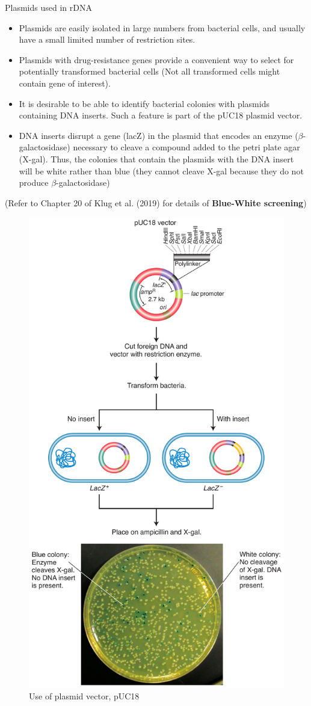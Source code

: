 \documentclass[11pt,dvipsnames,ignorenonframetext,aspectratio=169]{beamer}
\providecommand{\tightlist}{%
  \setlength{\itemsep}{0pt}\setlength{\parskip}{0pt}}
\begin{document}
\begin{frame}{Plasmids used in rDNA}
\protect\hypertarget{plasmids-used-in-rdna}{}
\begin{itemize}
\tightlist
\item
  Plasmids are easily isolated in large numbers from bacterial cells,
  and usually have a small limited number of restriction sites.
\item
  Plasmids with drug-resistance genes provide a convenient way to select
  for potentially transformed bacterial cells (Not all transformed cells
  might contain gene of interest).
\item
  It is desirable to be able to identify bacterial colonies with
  plasmids containing DNA inserts. Such a feature is part of the pUC18
  plasmid vector.
\item
  DNA inserts disrupt a gene (lacZ) in the plasmid that encodes an
  enzyme (\(\beta\)-galactosidase) necessary to cleave a compound added
  to the petri plate agar (X-gal). Thus, the colonies that contain the
  plasmids with the DNA insert will be white rather than blue (they
  cannot cleave X-gal because they do not produce
  \(\beta\)-galactosidase)
\end{itemize}

(Refer to Chapter 20 of Klug et al. (2019) for details of
\textbf{Blue-White screening})
\end{frame}

\begin{frame}{}
\protect\hypertarget{section-20}{}
\begin{figure}
\includegraphics[width=0.28\linewidth]{./../images/plasmid_vector_pUC18} \caption{Use of plasmid vector, pUC18}\label{fig:phage-vector}
\end{figure}
\end{frame}
\end{document}
